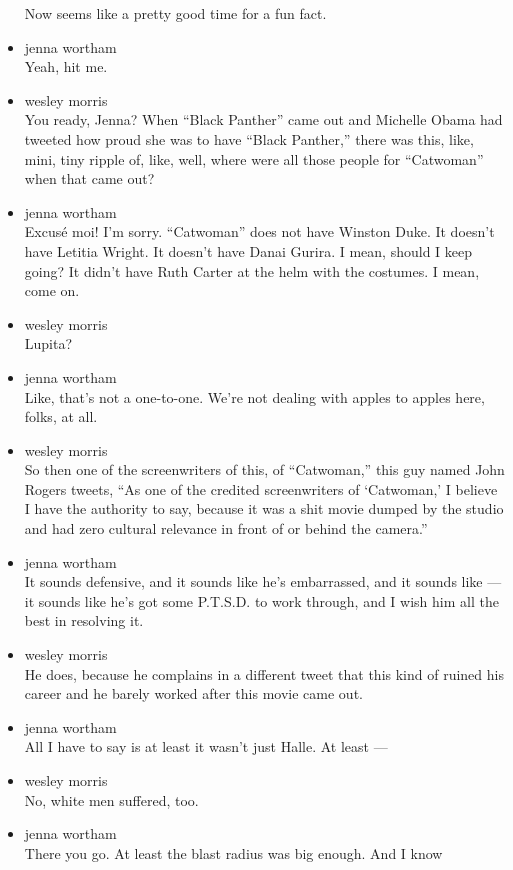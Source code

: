 \begin{itemize}
  Now seems like a pretty good time for a fun fact.
\item
  jenna wortham\\
  Yeah, hit me.
\item
  wesley morris\\
  You ready, Jenna? When ``Black Panther'' came out and Michelle Obama
  had tweeted how proud she was to have ``Black Panther,'' there was
  this, like, mini, tiny ripple of, like, well, where were all those
  people for ``Catwoman'' when that came out?
\item
  jenna wortham\\
  Excusé moi! I'm sorry. ``Catwoman'' does not have Winston Duke. It
  doesn't have Letitia Wright. It doesn't have Danai Gurira. I mean,
  should I keep going? It didn't have Ruth Carter at the helm with the
  costumes. I mean, come on.
\item
  wesley morris\\
  Lupita?
\item
  jenna wortham\\
  Like, that's not a one-to-one. We're not dealing with apples to apples
  here, folks, at all.
\item
  wesley morris\\
  So then one of the screenwriters of this, of ``Catwoman,'' this guy
  named John Rogers tweets, ``As one of the credited screenwriters of
  `Catwoman,' I believe I have the authority to say, because it was a
  shit movie dumped by the studio and had zero cultural relevance in
  front of or behind the camera.''
\item
  jenna wortham\\
  It sounds defensive, and it sounds like he's embarrassed, and it
  sounds like --- it sounds like he's got some P.T.S.D. to work through,
  and I wish him all the best in resolving it.
\item
  wesley morris\\
  He does, because he complains in a different tweet that this kind of
  ruined his career and he barely worked after this movie came out.
\item
  jenna wortham\\
  All I have to say is at least it wasn't just Halle. At least ---
\item
  wesley morris\\
  No, white men suffered, too.
\item
  jenna wortham\\
  There you go. At least the blast radius was big enough. And I know

\end{itemize}
